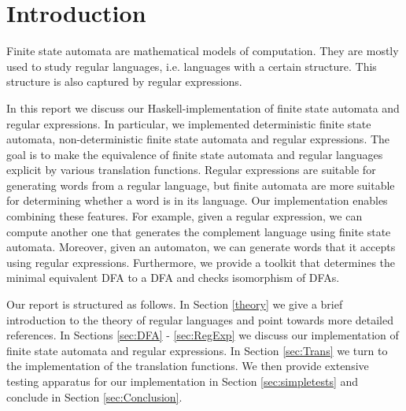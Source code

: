 \section{Introduction}

Finite state automata are mathematical models of computation.
They are mostly used to study regular languages, i.e. languages with a certain structure.
This structure is also captured by regular expressions.

In this report we discuss our Haskell-implementation of finite state automata and regular expressions.
In particular, we implemented deterministic finite state automata, non-deterministic finite state automata and regular expressions.
The goal is to make the equivalence of finite state automata and regular languages explicit by various translation functions. 
Regular expressions are suitable for generating words from a regular language, but finite automata are more suitable for determining whether 
a word is in its language. Our implementation enables combining these features. For example, given a regular expression, we can compute another one that generates
the complement language using finite state automata. Moreover, given an automaton, we can generate words that it accepts using regular expressions. Furthermore,
we provide a toolkit that determines the minimal equivalent DFA to a DFA and checks isomorphism of DFAs.

Our report is structured as follows. In Section \ref{theory} we give a brief introduction to the theory of regular languages and point towards more detailed references. 
In Sections \ref{sec:DFA} - \ref{sec:RegExp} we discuss our implementation of finite state automata and regular expressions. In Section \ref{sec:Trans} we turn to the
implementation of the translation functions. We then provide extensive testing apparatus for our implementation in Section \ref{sec:simpletests} and conclude in Section \ref{sec:Conclusion}. 